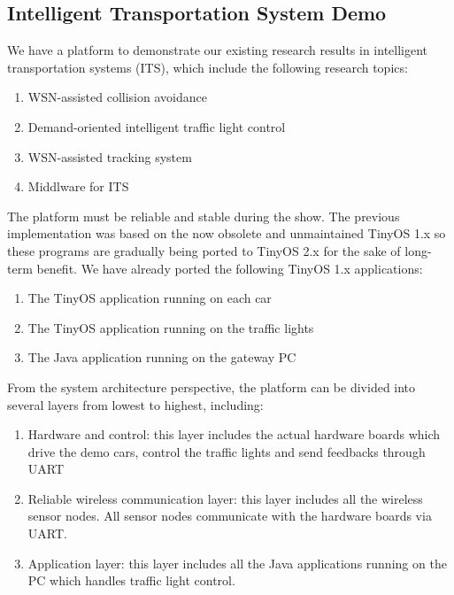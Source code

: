 
\subsection{Intelligent Transportation System Demo}

We have a platform to demonstrate our existing research results in intelligent transportation systems (ITS), which include the following research topics:

\begin{enumerate}
  \item WSN-assisted collision avoidance
  \item Demand-oriented intelligent traffic light control
  \item WSN-assisted tracking system
  \item Middlware for ITS
\end{enumerate}

The platform must be reliable and stable during the show. The previous implementation was based on the now obsolete and unmaintained TinyOS 1.x so these programs are gradually being ported to TinyOS 2.x for the sake of long-term benefit. We have already ported the following TinyOS 1.x applications:

\begin{enumerate}
  \item The TinyOS application running on each car
  \item The TinyOS application running on the traffic lights
  \item The Java application running on the gateway PC
\end{enumerate}

From the system architecture perspective, the platform can be divided into several layers from lowest to highest, including:

\begin{enumerate}
  \item Hardware and control: this layer includes the actual hardware boards which drive the demo cars, control the traffic lights and send feedbacks through UART
  \item Reliable wireless communication layer: this layer includes all the wireless sensor nodes. All sensor nodes communicate with the hardware boards via UART.
  \item Application layer: this layer includes all the Java applications running on the PC which handles traffic light control.
\end{enumerate}


